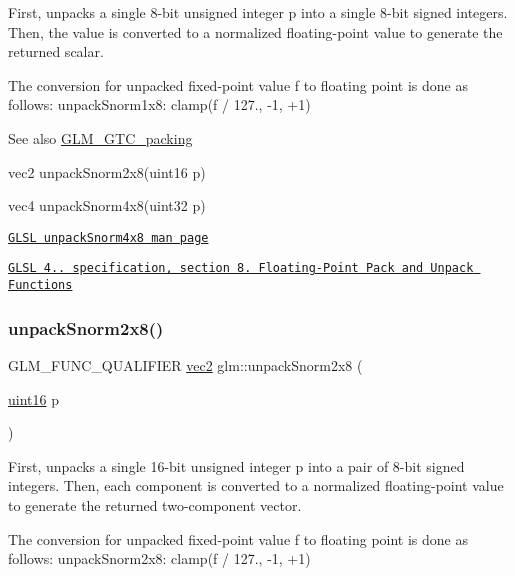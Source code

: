 First, unpacks a single 8-\/bit unsigned integer p into a single 8-\/bit signed integers. Then, the value is converted to a normalized floating-\/point value to generate the returned scalar.

The conversion for unpacked fixed-\/point value f to floating point is done as follows\+: unpack\+Snorm1x8\+: clamp(f / 127., -\/1, +1)

\begin{DoxySeeAlso}{See also}
\hyperlink{group__gtc__packing}{G\+L\+M\+\_\+\+G\+T\+C\+\_\+packing} 

vec2 unpack\+Snorm2x8(uint16 p) 

vec4 unpack\+Snorm4x8(uint32 p) 

\href{http://www.opengl.org/sdk/docs/manglsl/xhtml/unpackSnorm4x8.xml}{\tt G\+L\+SL unpack\+Snorm4x8 man page} 

\href{http://www.opengl.org/registry/doc/GLSLangSpec.4.20.8.pdf}{\tt G\+L\+SL 4.. specification, section 8. Floating-\/\+Point Pack and Unpack Functions} 
\end{DoxySeeAlso}
\mbox{\label{group__gtc__packing_ga27f30f0281b88e152b0895f5e2ead878}} 
\subsubsection{\texorpdfstring{unpack\+Snorm2x8()}{unpackSnorm2x8()}}
{\footnotesize\ttfamily G\+L\+M\+\_\+\+F\+U\+N\+C\+\_\+\+Q\+U\+A\+L\+I\+F\+I\+ER \hyperlink{group__core__types_gaa1618f51db67eaa145db101d8c8431d8}{vec2} glm\+::unpack\+Snorm2x8 (\begin{DoxyParamCaption}\item[{\hyperlink{group__gtc__type__precision_gad8c2939e1fdd8e5828b31d95c52255d5}{uint16}}]{p }\end{DoxyParamCaption})}

First, unpacks a single 16-\/bit unsigned integer p into a pair of 8-\/bit signed integers. Then, each component is converted to a normalized floating-\/point value to generate the returned two-\/component vector.

The conversion for unpacked fixed-\/point value f to floating point is done as follows\+: unpack\+Snorm2x8\+: clamp(f / 127., -\/1, +1)

